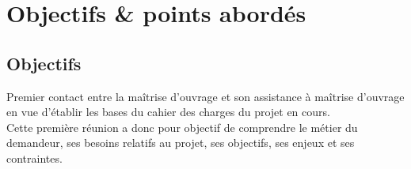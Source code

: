 \documentclass[11pt,fleqn]{report}
\begin{document}
\ZMakeCover


\chapter{Objectifs \& points abordés}

\section{Objectifs}
Premier contact entre la maîtrise d'ouvrage \mo et son assistance à maîtrise d'ouvrage \amo en vue d'établir les bases du cahier des charges du projet en cours.
\\
Cette première réunion a donc pour objectif de comprendre le métier du demandeur, ses besoins relatifs au projet, ses objectifs, ses enjeux et ses contraintes.
\end{document}
